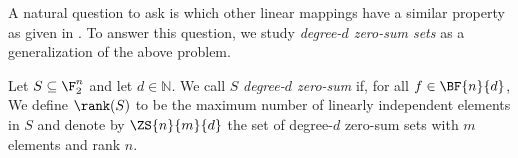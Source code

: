 
A natural question to ask is which other linear mappings have a similar property as given in . To answer this question, we study \emph{degree-$d$ zero-sum sets} as a generalization of the above problem. 

\begin{definition}
Let $S \subseteq \F_2^n$ and let $d \in \mathbb{N}$. We call $S$ \emph{degree-$d$ zero-sum} if, for all $f \in \BF{n}{d}$,
We define $\rank(S)$ to be the maximum number of linearly independent elements in $S$ and denote by $\ZS{n}{m}{d}$ the set of degree-$d$ zero-sum sets with $m$ elements and rank $n$.
\end{definition}

